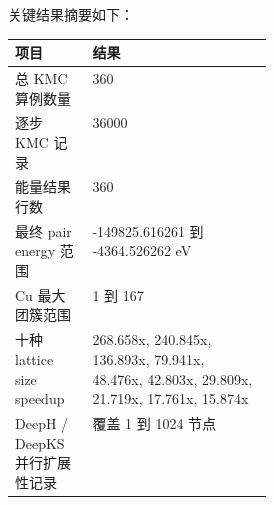 \documentclass[UTF8,11pt,fontset=none]{ctexart}
\renewcommand{\arraystretch}{1.18}
\begin{document}
关键结果摘要如下：

\begin{center}
\small
\renewcommand{\arraystretch}{1.30}
\begin{tabularx}{\linewidth}{L{0.30\linewidth}Y}
\hline
{}
\textbf{项目} & \textbf{结果} \\
\hline
总 KMC 算例数量 & 360 \\
\hline
逐步 KMC 记录 & 36000 \\
\hline
能量结果行数 & 360 \\
\hline
最终 pair energy 范围 & -149825.616261 到 -4364.526262 eV \\
\hline
Cu 最大团簇范围 & 1 到 167 \\
\hline
十种 lattice size speedup & 268.658x, 240.845x, 136.893x, 79.941x, 48.476x, 42.803x, 29.809x, 21.719x, 17.761x, 15.874x \\
\hline
DeepH / DeepKS 并行扩展性记录 & 覆盖 1 到 1024 节点 \\
\hline
\end{tabularx}
\end{center}
\end{document}
